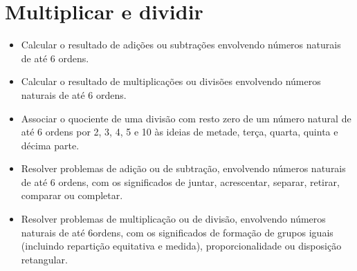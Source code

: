 \chapter{Multiplicar e dividir}


\begin{itemize}
\item Calcular o resultado de adições ou subtrações envolvendo números
naturais de até 6 ordens.

\item Calcular o resultado de multiplicações ou divisões envolvendo números
naturais de até 6 ordens.

\item Associar o quociente de uma divisão com resto zero de um número
natural de até 6 ordens por 2, 3, 4, 5 e 10 às ideias de metade, terça,
quarta, quinta e décima parte.

\item Resolver problemas de adição ou de subtração, envolvendo números
naturais de até 6 ordens, com os significados de juntar, acrescentar,
separar, retirar, comparar ou completar.

\item Resolver problemas de multiplicação ou de divisão, envolvendo números
naturais de até 6ordens, com os significados de formação de grupos
iguais (incluindo repartição equitativa e medida), proporcionalidade ou
disposição retangular.
\end{itemize}

